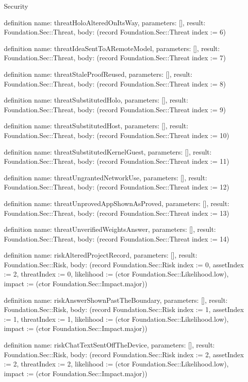 \begin{lexlean}{Security}
\begin{semanticmodule}
definition{
  name: threatHoloAlteredOnItsWay,
  parameters: [],
  result: Foundation.Sec::Threat,
  body: (record Foundation.Sec::Threat {index := 6})
}

definition{
  name: threatIdeaSentToARemoteModel,
  parameters: [],
  result: Foundation.Sec::Threat,
  body: (record Foundation.Sec::Threat {index := 7})
}

definition{
  name: threatStaleProofReused,
  parameters: [],
  result: Foundation.Sec::Threat,
  body: (record Foundation.Sec::Threat {index := 8})
}

definition{
  name: threatSubstitutedHolo,
  parameters: [],
  result: Foundation.Sec::Threat,
  body: (record Foundation.Sec::Threat {index := 9})
}

definition{
  name: threatSubstitutedHost,
  parameters: [],
  result: Foundation.Sec::Threat,
  body: (record Foundation.Sec::Threat {index := 10})
}

definition{
  name: threatSubstitutedKernelGuest,
  parameters: [],
  result: Foundation.Sec::Threat,
  body: (record Foundation.Sec::Threat {index := 11})
}

definition{
  name: threatUngrantedNetworkUse,
  parameters: [],
  result: Foundation.Sec::Threat,
  body: (record Foundation.Sec::Threat {index := 12})
}

definition{
  name: threatUnprovedAppShownAsProved,
  parameters: [],
  result: Foundation.Sec::Threat,
  body: (record Foundation.Sec::Threat {index := 13})
}

definition{
  name: threatUnverifiedWeightsAnswer,
  parameters: [],
  result: Foundation.Sec::Threat,
  body: (record Foundation.Sec::Threat {index := 14})
}

definition{
  name: riskAlteredProjectRecord,
  parameters: [],
  result: Foundation.Sec::Risk,
  body: (record Foundation.Sec::Risk {index := 0, assetIndex := 2, threatIndex := 0, likelihood := (ctor Foundation.Sec::Likelihood.low), impact := (ctor Foundation.Sec::Impact.major)})
}

definition{
  name: riskAnswerShownPastTheBoundary,
  parameters: [],
  result: Foundation.Sec::Risk,
  body: (record Foundation.Sec::Risk {index := 1, assetIndex := 1, threatIndex := 1, likelihood := (ctor Foundation.Sec::Likelihood.low), impact := (ctor Foundation.Sec::Impact.major)})
}

definition{
  name: riskChatTextSentOffTheDevice,
  parameters: [],
  result: Foundation.Sec::Risk,
  body: (record Foundation.Sec::Risk {index := 2, assetIndex := 2, threatIndex := 2, likelihood := (ctor Foundation.Sec::Likelihood.low), impact := (ctor Foundation.Sec::Impact.major)})
}


\end{semanticmodule}
\end{lexlean}
